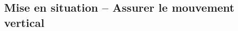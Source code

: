 \iflivret

\else

\fi
\setlength{\columnseprule}{.1pt}

\pagestyle{fancy}
\thispagestyle{plain}

\ifprof
\vspace{5.1cm}
\else
\vspace{5.2cm}
\fi

\def\columnseprulecolor{\color{ocre}}
\setlength{\columnseprule}{0.4pt} 


\setcounter{exo}{0}



\ifprof
\else
\begin{multicols}{2}
\fi

\section*{Mise en situation -- Assurer le mouvement vertical}
\ifprof
\else


\end{multicols}
